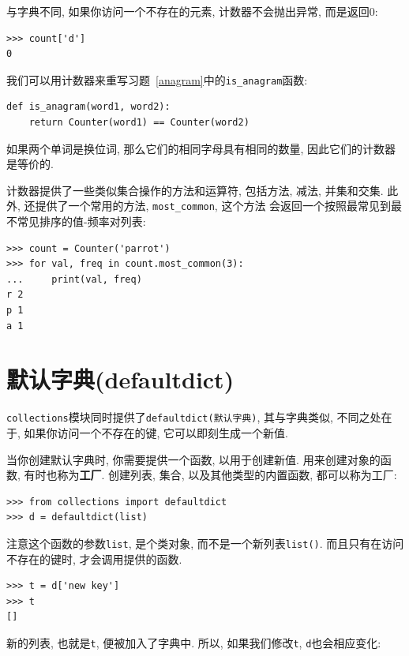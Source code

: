 \documentclass[10pt]{book}
\begin{document}
与字典不同, 如果你访问一个不存在的元素, 计数器不会抛出异常, 而是返回0:

\begin{verbatim}
>>> count['d']
0
\end{verbatim}

我们可以用计数器来重写习题~\ref{anagram}中的\verb"is_anagram"函数:

\begin{verbatim}
def is_anagram(word1, word2):
    return Counter(word1) == Counter(word2)
\end{verbatim}

如果两个单词是换位词, 那么它们的相同字母具有相同的数量, 因此它们的计数器是等价的. 

计数器提供了一些类似集合操作的方法和运算符, 
包括方法, 减法, 并集和交集. 
此外, 还提供了一个常用的方法, \verb"most_common", 这个方法
会返回一个按照最常见到最不常见排序的值-频率对列表:

\begin{verbatim}
>>> count = Counter('parrot')
>>> for val, freq in count.most_common(3):
...     print(val, freq)
r 2
p 1
a 1
\end{verbatim}

\section{默认字典(defaultdict)}

{\tt collections}模块同时提供了{\tt defaultdict(默认字典)}, 
其与字典类似, 不同之处在于, 如果你访问一个不存在的键, 它可以即刻生成一个新值. 

当你创建默认字典时, 你需要提供一个函数, 以用于创建新值. 
用来创建对象的函数, 有时也称为{\bf 工厂}.
创建列表, 集合, 以及其他类型的内置函数, 都可以称为工厂:

\begin{verbatim}
>>> from collections import defaultdict
>>> d = defaultdict(list)
\end{verbatim}

注意这个函数的参数{\tt list}, 是个类对象, 
而不是一个新列表{\tt list()}. 
而且只有在访问不存在的键时, 才会调用提供的函数.

\begin{verbatim}
>>> t = d['new key']
>>> t
[]
\end{verbatim}

新的列表, 也就是{\tt t}, 便被加入了字典中. 
所以, 如果我们修改{\tt t}, {\tt d}也会相应变化:
\end{document}

